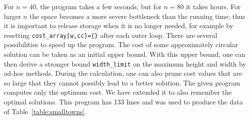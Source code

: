\documentclass[preprint,authoryear,12pt]{elsarticle}
\begin{document}
For $n=40$, the program takes a few seconds, but for $n=80$ it takes
hours.
For larger $n$ the space becomes a more severe bottleneck than
the running time; thus it is important to release
 storage when it is no longer needed, for
example by resetting {\tt \verb:cost_array:[\verb:w:,\verb:cc:]=\verb:{}:}
after each outer loop.
There are several possibilities to speed up the program.
The cost of some approximately circular solution can be taken as an
initial upper bound.  With this upper bound, one can then derive a
stronger bound \verb:width_limit: on the maximum height and width by
{ad-hoc} methods.  During the calculation, one can also prune cost
values that are so large that they cannot possibly lead to a better
solution.  The given program computes only the optimum cost. We have
extended it to also remember the optimal solutions. This program has
133 lines and was used to produce the data of
Table~\ref{table:smalltowns}.
\end{document}
